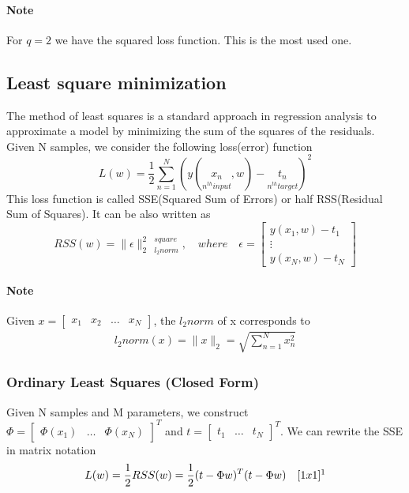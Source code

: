 \documentclass[../main.tex]{subfiles}
\begin{document}
\paragraph{Note} For $q=2$ we have the squared loss function. This is the most used one.

\subsection{Least square minimization}
The method of least squares is a standard approach in regression analysis to approximate a model by minimizing the sum of the squares of the residuals. Given N samples, we consider the following loss(error) function
\begin{equation}
    L(w)=\frac{1}{2}\sum_{n=1}^N(y(\underset{n^{th}input}{x_n},w)-\underset{n^{th}target}{t_n})^2
\end{equation}
This loss function is called SSE(Squared Sum of Errors) or half RSS(Residual Sum of Squares). It can be also written as
\begin{equation}
    RSS(w)=\|\epsilon\|_{2\quad l_2norm}^{2\quad square},\quad where \quad \epsilon=\begin{bmatrix}y(x_1,w)-t_1\\ \vdots \\ y(x_N,w)-t_N\end{bmatrix}
\end{equation}
\paragraph{Note} Given $x=\begin{bmatrix}x_1 & x_2 & \dots & x_{N}\end{bmatrix}$, the $l_2 norm$ of x corresponds to
\begin{align}
    l_2norm(x) = \|x\|_{2} = \sqrt{\sum_{n=1}^{N} x_n^2}
\end{align}

\newpage
\subsubsection{Ordinary Least Squares (Closed Form)}
Given N samples and M parameters, we construct $\Phi=\begin{bmatrix}\Phi(x_1) & \dots & \Phi(x_N)\end{bmatrix}^T$ and $t=\begin{bmatrix}t_1 & \dots & t_N\end{bmatrix}^T$.
\newline
We can rewrite the SSE in matrix notation
\begin{equation}
    L(w) = \frac{1}{2}RSS(w)=\frac{1}{2}(t-\Phi w)^T(t-\Phi w) \quad [1x1]\footnotemark
\end{equation}
\end{document}
